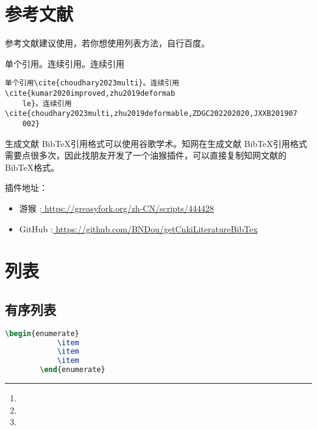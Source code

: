 \section{参考文献}
参考文献建议使用，若你想使用列表方法，自行百度。

单个引用\cite{choudhary2023multi}。连续引用\cite{kumar2020improved,zhu2019deformable}。连续引用\cite{choudhary2023multi,zhu2019deformable,ZDGC202202020,JXXB201907002}
\begin{lstlisting}
单个引用\cite{choudhary2023multi}。连续引用\cite{kumar2020improved,zhu2019deformab
	le}。连续引用\cite{choudhary2023multi,zhu2019deformable,ZDGC202202020,JXXB201907
	002}
\end{lstlisting}
生成文献 Bib\TeX 引用格式可以使用谷歌学术。知网在生成文献 Bib\TeX 引用格式需要点很多次，因此找朋友开发了一个油猴插件，可以直接复制知网文献的Bib\TeX 格式。

插件地址：\begin{itemize}
	\item 游猴 :\href{https://greasyfork.org/zh-CN/scripts/444428}{ \;\;https://greasyfork.org/zh-CN/scripts/444428}

	\item GitHub \faGithub :\href{https://github.com/BNDou/getCnkiLiteratureBibTex}{ \;\;https://github.com/BNDou/getCnkiLiteratureBibTex}
\end{itemize}

\section{列表}


\subsection{有序列表}
\begin{minipage}[t]{0.48\textwidth}
	\begin{lstlisting}[language=TeX]
		\begin{enumerate}
			\item 
			\item 
			\item 
		\end{enumerate}
	\end{lstlisting} 
\end{minipage}
\begin{minipage}[t]{0.48\textwidth}
	\rule[-10pt]{10cm}{0em}
	\begin{enumerate}
		\item 
		\item 
		\item 
	\end{enumerate}
\end{minipage}

